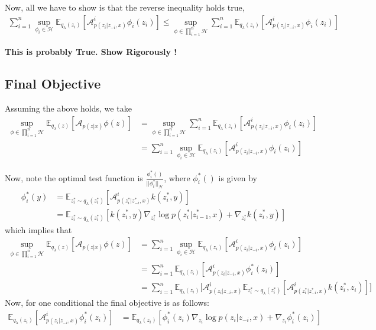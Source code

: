 \documentclass[12pt,twoside]{article}
\begin{document}
Now, all we have to show is that the reverse inequality holds true,
\begin{align*}
\sum_{i=1}^{n} \sup_{\phi_{i} \in \mathcal{H}} \mathbb{E}_{q_{\lambda}(z_{i})}[ \mathcal{A}^{i}_{p(z_{i} | z_{-i}, x)} \phi_{i}(z_{i}) ] \leq \sup_{\phi \in \prod_{i=1}^{n} \mathcal{H}}\sum_{i=1}^{n}\mathbb{E}_{q_{\lambda}(z_{i})}[ \mathcal{A}^{i}_{p(z_{i} | z_{-i}, x)} \phi_{i}(z_{i}) ]
\end{align*}

\textbf{This is probably True. Show Rigorously !}

\subsection{Final Objective}
Assuming the above holds, we take
\begin{align}
\sup_{\phi \in \prod_{i=1}^{n} \mathcal{H}} \mathbb{E}_{q_{\lambda}(z)}[ \mathcal{A}_{p(z | x)} \phi(z) ] &= \sup_{\phi \in \prod_{i=1}^{n} \mathcal{H}}\sum_{i=1}^{n}\mathbb{E}_{q_{\lambda}(z_{i})}[ \mathcal{A}^{i}_{p(z_{i} | z_{-i}, x)} \phi_{i}(z_{i}) ] \\
&= \sum_{i=1}^{n} \sup_{\phi_{i} \in \mathcal{H}} \mathbb{E}_{q_{\lambda}(z_{i})}[ \mathcal{A}^{i}_{p(z_{i} | z_{-i}, x)} \phi_{i}(z_{i}) ]
\end{align}

Now, note the optimal test function is $\frac{\phi_{i}^{*}()}{||\phi_{i}^{*}||_{\mathcal{H}}}$, where $\phi_{i}^{*}()$ is given by
\begin{align*}
\phi_{i}^{*}(y) &= \mathbb{E}_{z^{*}_{i} \sim q_{\lambda}(z^{*}_i)}[ \mathcal{A}^{i}_{p(z^{*}_{i}|z^{*}_{-i}, x)}k(z^{*}_{i}, y) ] \\
&= \mathbb{E}_{z^{*}_{i} \sim q_{\lambda}(z^{*}_i)} [ k(z^{*}_i, y) \nabla_{z^{*}_i} \log p(z^{*}_i|z^{*}_{i-1},x) + \nabla_{z^{*}_i} k(z^{*}_i, y)]
\end{align*}
which implies that
\begin{align*}
\sup_{\phi \in \prod_{i=1}^{n} \mathcal{H}} \mathbb{E}_{q_{\lambda}(z)}[ \mathcal{A}_{p(z | x)} \phi(z) ] &= \sum_{i=1}^{n} \sup_{\phi_{i} \in \mathcal{H}} \mathbb{E}_{q_{\lambda}(z_{i})}[ \mathcal{A}^{i}_{p(z_{i} | z_{-i}, x)} \phi_{i}(z_{i}) ] \\
&= \sum_{i=1}^{n} \mathbb{E}_{q_{\lambda}(z_{i})}[ \mathcal{A}^{i}_{p(z_{i} | z_{-i}, x)} \phi^{*}_{i}(z_{i}) ] \\
&= \sum_{i=1}^{n} \mathbb{E}_{q_{\lambda}(z_{i})}\big[ \mathcal{A}^{i}_{p(z_{i} | z_{-i}, x)} \mathbb{E}_{z^{*}_{i} \sim q_{\lambda}(z^{*}_i)}[ \mathcal{A}^{i}_{p(z^{*}_{i}|z^{*}_{-i}, x)}k(z^{*}_{i}, z_i) ] \big]
\end{align*}
Now, for one conditional the final objective is as follows:
\begin{align}
\mathbb{E}_{q_{\lambda}(z_{i})}[ \mathcal{A}^{i}_{p(z_{i} | z_{-i}, x)} \phi^{*}_{i}(z_{i}) ]  &= \mathbb{E}_{q_{\lambda}(z_{i})}[ \phi_{i}^{*}(z_{i}) \nabla_{z_{i}}\log p(z_{i}|z_{-i},x) + \nabla_{z_{i}} \phi_{i}^{*}(z_{i})]
\end{align}
\end{document}
